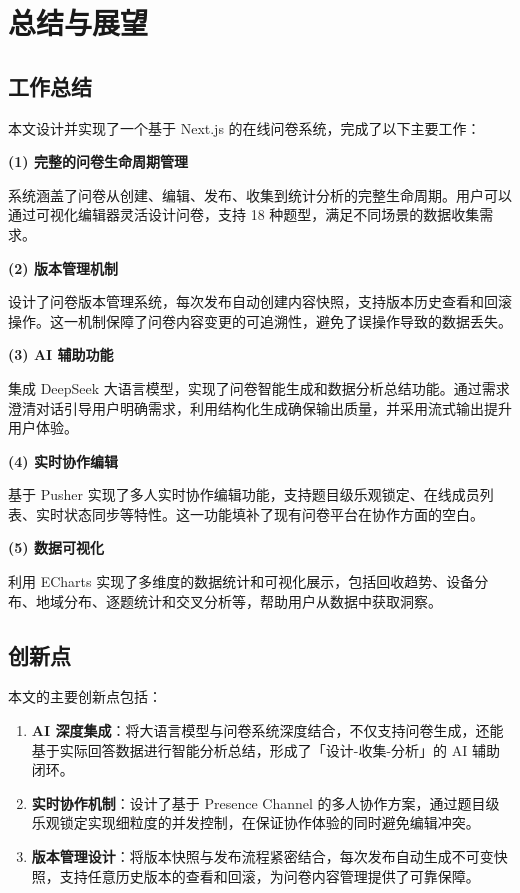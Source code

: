 \section{总结与展望}

\subsection{工作总结}

本文设计并实现了一个基于 Next.js 的在线问卷系统，完成了以下主要工作：

\textbf{(1) 完整的问卷生命周期管理}

系统涵盖了问卷从创建、编辑、发布、收集到统计分析的完整生命周期。用户可以通过可视化编辑器灵活设计问卷，支持 18 种题型，满足不同场景的数据收集需求。

\textbf{(2) 版本管理机制}

设计了问卷版本管理系统，每次发布自动创建内容快照，支持版本历史查看和回滚操作。这一机制保障了问卷内容变更的可追溯性，避免了误操作导致的数据丢失。

\textbf{(3) AI 辅助功能}

集成 DeepSeek 大语言模型，实现了问卷智能生成和数据分析总结功能。通过需求澄清对话引导用户明确需求，利用结构化生成确保输出质量，并采用流式输出提升用户体验。

\textbf{(4) 实时协作编辑}

基于 Pusher 实现了多人实时协作编辑功能，支持题目级乐观锁定、在线成员列表、实时状态同步等特性。这一功能填补了现有问卷平台在协作方面的空白。

\textbf{(5) 数据可视化}

利用 ECharts 实现了多维度的数据统计和可视化展示，包括回收趋势、设备分布、地域分布、逐题统计和交叉分析等，帮助用户从数据中获取洞察。

\subsection{创新点}

本文的主要创新点包括：

\begin{enumerate}[label=(\arabic*)]
  \item \textbf{AI 深度集成}：将大语言模型与问卷系统深度结合，不仅支持问卷生成，还能基于实际回答数据进行智能分析总结，形成了「设计-收集-分析」的 AI 辅助闭环。
  
  \item \textbf{实时协作机制}：设计了基于 Presence Channel 的多人协作方案，通过题目级乐观锁定实现细粒度的并发控制，在保证协作体验的同时避免编辑冲突。
  
  \item \textbf{版本管理设计}：将版本快照与发布流程紧密结合，每次发布自动生成不可变快照，支持任意历史版本的查看和回滚，为问卷内容管理提供了可靠保障。
\end{enumerate}

